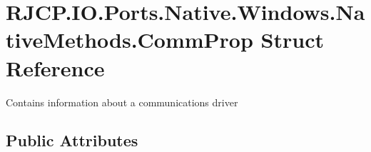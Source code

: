 \hypertarget{struct_r_j_c_p_1_1_i_o_1_1_ports_1_1_native_1_1_windows_1_1_native_methods_1_1_comm_prop}{}\section{R\+J\+C\+P.\+I\+O.\+Ports.\+Native.\+Windows.\+Native\+Methods.\+Comm\+Prop Struct Reference}
\label{struct_r_j_c_p_1_1_i_o_1_1_ports_1_1_native_1_1_windows_1_1_native_methods_1_1_comm_prop}


Contains information about a communications driver  


\subsection*{Public Attributes}

